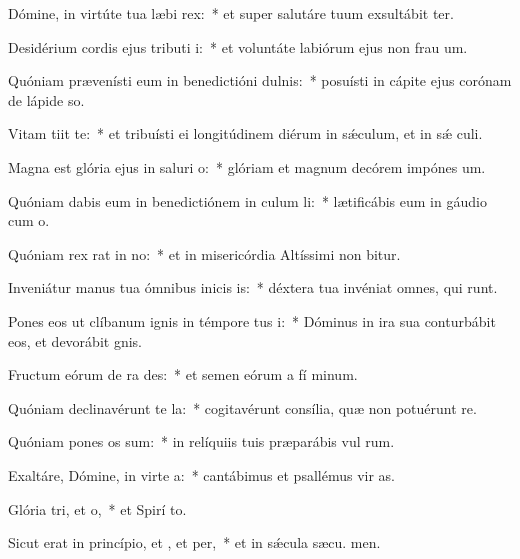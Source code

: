 \item Dómine, in virtúte tua læbi rex:~* et super salutáre tuum exsultábit ter.
\item Desidérium cordis ejus tributi i:~* et voluntáte labiórum ejus non frau um.
\item Quóniam prævenísti eum in benedictióni dulnis:~* posuísti in cápite ejus corónam de lápide so.
\item Vitam tiit  te:~* et tribuísti ei longitúdinem diérum in sǽculum, et in sǽ culi.
\item Magna est glória ejus in saluri o:~* glóriam et magnum decórem impónes  um.
\item Quóniam dabis eum in benedictiónem in culum li:~* lætificábis eum in gáudio cum  o.
\item Quóniam rex rat in no:~* et in misericórdia Altíssimi non bitur.
\item Inveniátur manus tua ómnibus inicis is:~* déxtera tua invéniat omnes, qui  runt.
\item Pones eos ut clíbanum ignis in témpore tus i:~* Dóminus in ira sua conturbábit eos, et devorábit  gnis.
\item Fructum eórum de ra des:~* et semen eórum a fí minum.
\item Quóniam declinavérunt  te la:~* cogitavérunt consília, quæ non potuérunt re.
\item Quóniam pones os sum:~* in relíquiis tuis præparábis vul rum.
\item Exaltáre, Dómine, in virte a:~* cantábimus et psallémus vir as.
\item Glória tri, et o,~* et Spirí to.
\item Sicut erat in princípio, et , et per,~* et in sǽcula sæcu. men.
